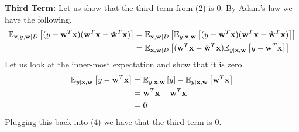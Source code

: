 \documentclass[submit]{harvardml}
\newcommand{\what}{\hat{\vb{w}}}
\newcommand{\E}{\mathbb{E}}
\begin{document}
\textbf{Third Term:} Let us show that the third term from (2) is $0$. By Adam's law we have the following.
\begin{align}
    \E_{\vb{x}, y, \vb{w} | D}\left[(y - \vb{w}^T\vb{x})(\vb{w}^T\vb{x} - \what^T \vb{x})\right] &= \E_{\vb{x}, \vb{w} | D}\left[ \E_{y | \vb{x}, \vb{w}} \left[ (y - \vb{w}^T\vb{x})(\vb{w}^T\vb{x} - \what^T \vb{x}) \right] \right]\\
    &= \E_{\vb{x}, \vb{w} | D} \left[ (\vb{w}^T \vb{x} - \what^T \vb{x}) \E_{y | \vb{x}, \vb{w}} \left[ y - \vb{w}^T \vb{x} \right] \right]
\end{align}
Let us look at the inner-most expectation and show that it is zero.
\begin{align*}
    \E_{y | \vb{x}, \vb{w}} \left[ y - \vb{w}^T \vb{x} \right] &= \E_{y | \vb{x}, \vb{w}} \left[ y \right] - \E_{y | \vb{x}, \vb{w}} \left[ \vb{w}^T\vb{x} \right] \\
    &= \vb{w}^T \vb{x} - \vb{w}^T \vb{x} \\
    &= 0
\end{align*}
Plugging this back into (4) we have that the third term is $0$.
\end{document}
